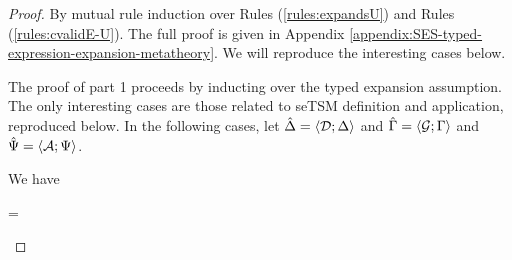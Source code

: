 \begin{proof}
By mutual rule induction over Rules (\ref{rules:expandsU}) and Rules (\ref{rules:cvalidE-U}). The full proof is given in Appendix \ref{appendix:SES-typed-expression-expansion-metatheory}. We will reproduce the interesting cases below. 

The proof of part 1 proceeds by inducting over the typed expansion assumption. The only interesting cases are those related to seTSM definition and application, reproduced below. In the following cases, let $\hat{\Delta}=\langle \mathcal{D}; \Delta \rangle$ and $\hat{\Gamma}=\langle \mathcal{G}; \Gamma \rangle$ and $\hat{\Psi}=\langle \mathcal{A}; \Psi \rangle$.

\begin{byCases}
\item[\text{(\ref{rule:expandsU-syntax})}] We have 
\begin{pfsteps}
  \item \ue= 
  \item {}  
 \item \hastypeU{\emptyset}{\emptyset}{\eparse}{\aparr{\tBody}{\tParseResultExp}} 
  \item {} 
 \item {}  
  \item {} 
\end{pfsteps}
\resetpfcounter 


\end{byCases}
\end{proof}
